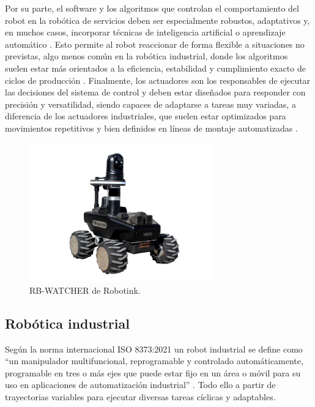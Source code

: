 Por su parte, el software y los algoritmos que controlan el comportamiento del robot en la robótica de servicios deben ser especialmente robustos, adaptativos y, en muchos casos, incorporar técnicas de inteligencia artificial o aprendizaje automático \cite{definicion_robot_2}. Esto permite al robot reaccionar de forma flexible a situaciones no previstas, algo menos común en la robótica industrial, donde los algoritmos suelen estar más orientados a la eficiencia, estabilidad y cumplimiento exacto de ciclos de producción \cite{definicion_robot_2}. Finalmente, los actuadores son los responsables de ejecutar las decisiones del sistema de control y deben estar diseñados para responder con precisión y versatilidad, siendo capaces de adaptarse a tareas muy variadas, a diferencia de los actuadores industriales, que suelen estar optimizados para movimientos repetitivos y bien definidos en líneas de montaje automatizadas \cite{definicion_robot_2}.

\begin{figure} [h!]
  \begin{center}
    \includegraphics[width=8cm]{figs/Robot_intro}
  \end{center}
  \caption{\centering RB-WATCHER de Robotink.}
  \label{fig:Robot_intro}
\end{figure}

\subsection{Robótica industrial}

Según la norma internacional ISO 8373:2021 un robot industrial se define como ``un manipulador multifuncional, reprogramable y controlado automáticamente, programable en tres o más ejes que puede estar fijo en un área o móvil para su uso en aplicaciones de automatización industrial'' \cite{definicion_iso}. Todo ello a partir de trayectorias variables para ejecutar diversas tareas cíclicas y adaptables. 

